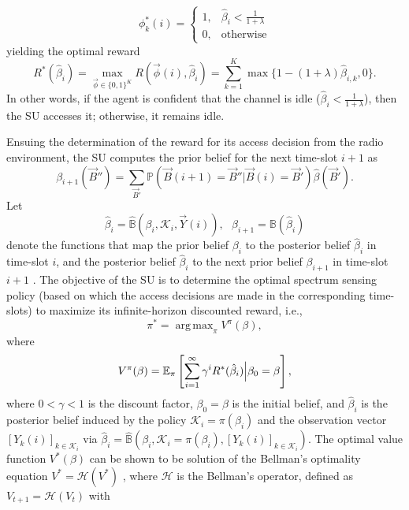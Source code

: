 \documentclass[12pt, draftcls, onecolumn]{IEEEtran}
\DeclareMathOperator*{\argmax}{arg\,max}
\begin{document}
\begin{equation}
    \phi_{k}^{*}(i) = \left\{
        \begin{array}{cc}
             1, &  \hat{\beta}_{i}{<}\frac{1}{1{+}\lambda}\\
             0, &  \text{otherwise}
        \end{array}\right.
\end{equation}
yielding the optimal reward
$$
R^*(\hat{\beta}_{i})=\max_{\vec{\phi}\in\{0,1\}^K} R(\vec{\phi}(i),\hat{\beta}_{i})
=
\sum_{k=1}^{K}\max\{1-(1+\lambda)\hat{\beta}_{i,k},0\}.
$$
In other words, if the agent is confident that the channel is idle ($\hat{\beta}_{i}{<}\frac{1}{1{+}\lambda}$), then the SU accesses it; otherwise, it remains idle.

Ensuing the determination of the reward for its access decision from the radio environment, the SU computes the prior belief for the next time-slot $i+1$ as
\begin{equation}\label{13}
    \beta_{i+1}(\vec{B}'')=\sum_{\vec{B}'}\mathbb{P}(\vec{B}(i+1)=\vec{B}''|\vec{B}(i)=\vec{B}')\hat{\beta}(\vec{B}').
\end{equation}
Let
\begin{equation}\label{14}
    \hat{\beta}_{i}=\hat{\mathbb{B}}(\beta_{i},\mathcal{K}_{i},\vec{Y}(i)),\ \ \ \beta_{i+1}=\mathbb{B}(\hat{\beta}_{i})
\end{equation}
denote the functions that map the prior belief $\beta_{i}$ to the posterior belief $\hat{\beta}_{i}$ in time-slot $i$, and the posterior belief $\hat{\beta}_{i}$ to the next prior belief $\beta_{i+1}$ in time-slot $i+1$ . The objective of the SU is to determine the optimal spectrum sensing policy (based on which the access decisions are made in the corresponding time-slots) to maximize its infinite-horizon discounted reward, i.e.,
\begin{equation}\label{16}
    \pi^{*}=\argmax_{\pi}V^{\pi}(\beta),
\end{equation}
where
\begin{equation}\label{17}
    V^{\pi}(\beta)=\mathbb{E}_{\pi}\left[\sum_{i=1}^{\infty}\gamma^{i}
    R^*(\hat{\beta}_{i})\Big{|}\beta_{0}=\beta\right],
\end{equation}
where $0{<}\gamma{<}1$ is the discount factor, $\beta_{0}{=}\beta$ is the initial belief, and $\hat{\beta}_{i}$ is the posterior belief induced by the policy $\mathcal{K}_{i}{=}\pi(\beta_{i})$ and the observation vector $[Y_{k}(i)]_{k{\in}\mathcal{K}_{i}}$ via $\hat{\beta}_{i} = \hat{\mathbb{B}}(\beta_{i}, \mathcal{K}_{i} = \pi(\beta_{i}), [Y_{k}(i)]_{k \in \mathcal{K}_{i}})$. The optimal value function $V^*(\beta)$ can be shown to be solution of the Bellman's optimality equation $V^{*}{=}\mathcal{H}(V^{*})$ \cite{PUOccupancy:18}, where $\mathcal H$ is the Bellman's operator, defined as $V_{t+1}{=}\mathcal{H}(V_t)$ with
\end{document}
